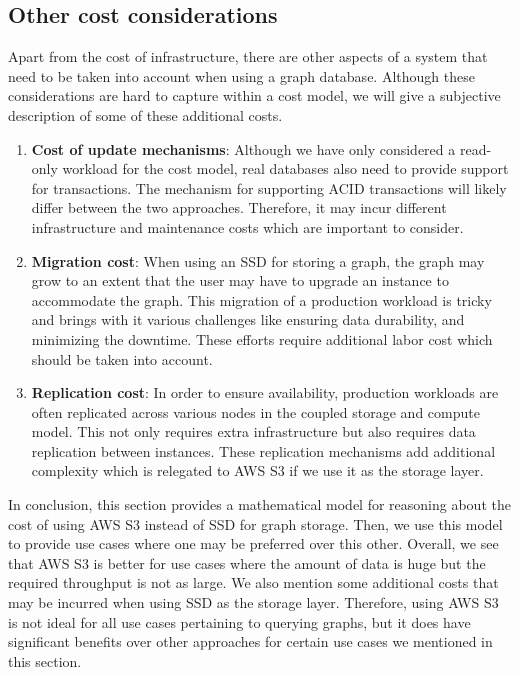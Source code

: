 \subsection{Other cost considerations}
Apart from the cost of infrastructure, there are other aspects of a system that
need to be taken into account when using a graph database. Although these
considerations are hard to capture within a cost model, we will give a subjective
description of some of these additional costs.
\begin{enumerate}
    \item \textbf{Cost of update mechanisms}: Although we have only considered a
        read-only workload for the cost model, real databases also need to
        provide support for transactions. The mechanism for supporting ACID
        transactions will likely differ between the two approaches. Therefore,
        it may incur different infrastructure and maintenance costs which are
        important to consider.
    \item \textbf{Migration cost}: When using an SSD for storing a graph, the
        graph may grow to an extent that the user may have to upgrade an
        instance to accommodate the graph. This migration of a production
        workload is tricky and brings with it various challenges like ensuring
        data durability, and minimizing the downtime. These efforts require
        additional labor cost which should be taken into account.
    \item \textbf{Replication cost}: In order to ensure availability, production
        workloads are often replicated across various nodes in the coupled
        storage and compute model. This not only requires extra infrastructure
        but also requires data replication between instances. These replication
        mechanisms add additional complexity which is relegated to AWS S3 if we
        use it as the storage layer.
\end{enumerate}

\medskip
In conclusion, this section provides a mathematical model for reasoning about
the cost of using AWS S3 instead of SSD for graph storage. Then, we use this
model to provide use cases where one may be preferred over this other. Overall,
we see that AWS S3 is better for use cases where the amount of data is huge but
the required throughput is not as large. We also mention some additional costs
that may be incurred when using SSD as the storage layer. Therefore, using AWS S3 is
not ideal for all use cases pertaining to querying graphs, but it does have
significant benefits over other approaches for certain use cases we mentioned in
this section.

